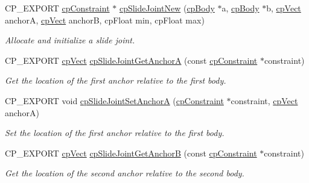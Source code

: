 \begin{DoxyCompactItemize}
\mbox{\label{group__cpSlideJoint_ga68ac9943feb8a3b1c69bdd259c34b3b2}} 
C\+P\+\_\+\+E\+X\+P\+O\+RT \hyperlink{structcpConstraint}{cp\+Constraint} $\ast$ \hyperlink{group__cpSlideJoint_ga68ac9943feb8a3b1c69bdd259c34b3b2}{cp\+Slide\+Joint\+New} (\hyperlink{structcpBody}{cp\+Body} $\ast$a, \hyperlink{structcpBody}{cp\+Body} $\ast$b, \hyperlink{structcpVect}{cp\+Vect} anchorA, \hyperlink{structcpVect}{cp\+Vect} anchorB, cp\+Float min, cp\+Float max)
\begin{DoxyCompactList}\small\item\em Allocate and initialize a slide joint. \end{DoxyCompactList}\item 
\mbox{\label{group__cpSlideJoint_gaccd837187f30d2d436bb64687213295f}} 
C\+P\+\_\+\+E\+X\+P\+O\+RT \hyperlink{structcpVect}{cp\+Vect} \hyperlink{group__cpSlideJoint_gaccd837187f30d2d436bb64687213295f}{cp\+Slide\+Joint\+Get\+AnchorA} (const \hyperlink{structcpConstraint}{cp\+Constraint} $\ast$constraint)
\begin{DoxyCompactList}\small\item\em Get the location of the first anchor relative to the first body. \end{DoxyCompactList}\item 
\mbox{\label{group__cpSlideJoint_ga5691e068b53dfa82182d5de9c47e7d4f}} 
C\+P\+\_\+\+E\+X\+P\+O\+RT void \hyperlink{group__cpSlideJoint_ga5691e068b53dfa82182d5de9c47e7d4f}{cp\+Slide\+Joint\+Set\+AnchorA} (\hyperlink{structcpConstraint}{cp\+Constraint} $\ast$constraint, \hyperlink{structcpVect}{cp\+Vect} anchorA)
\begin{DoxyCompactList}\small\item\em Set the location of the first anchor relative to the first body. \end{DoxyCompactList}\item 
\mbox{\label{group__cpSlideJoint_ga0230341fdf16923177c497f771d8eebb}} 
C\+P\+\_\+\+E\+X\+P\+O\+RT \hyperlink{structcpVect}{cp\+Vect} \hyperlink{group__cpSlideJoint_ga0230341fdf16923177c497f771d8eebb}{cp\+Slide\+Joint\+Get\+AnchorB} (const \hyperlink{structcpConstraint}{cp\+Constraint} $\ast$constraint)
\begin{DoxyCompactList}\small\item\em Get the location of the second anchor relative to the second body. \end{DoxyCompactList}\item 

\end{DoxyCompactItemize}
